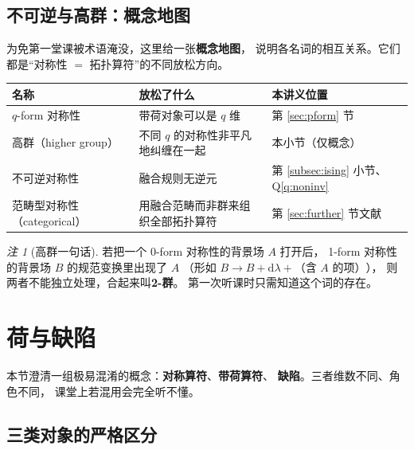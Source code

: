 \documentclass[UTF8,a4paper,11pt]{ctexart}
\theoremstyle{plain}
\theoremstyle{definition}
\theoremstyle{remark}
\newtheorem{remark}{注}[section]
\newcommand{\ext}{\mathrm{d}}          %
\newcommand{\en}[1]{\textsf{#1}}       %
\begin{document}
\subsection{不可逆与高群：概念地图}
\label{subsec:beyond}

为免第一堂课被术语淹没，这里给一张\textbf{概念地图}，
说明各名词的相互关系。它们都是“对称性 $=$ 拓扑算符”的不同放松方向。

\begin{center}
\begin{tabular}{@{}lll@{}}
\toprule
名称 & 放松了什么 & 本讲义位置 \\
\midrule
$q$-form 对称性 & 带荷对象可以是 $q$ 维
  & 第 \ref{sec:pform} 节 \\
高群（\en{higher group}） & 不同 $q$ 的对称性非平凡地纠缠在一起
  & 本小节（仅概念）\\
不可逆对称性 & 融合规则无逆元
  & 第 \ref{subsec:ising} 小节、Q\ref{q:noninv} \\
范畴型对称性（\en{categorical}） & 用融合范畴而非群来组织全部拓扑算符
  & 第 \ref{sec:further} 节文献 \\
\bottomrule
\end{tabular}
\end{center}

\begin{remark}[高群一句话]
若把一个 0-form 对称性的背景场 $A$ 打开后，
1-form 对称性的背景场 $B$ 的规范变换里出现了 $A$
（形如 $B\to B+\ext\lambda+\text{（含 }A\text{ 的项）}$），
则两者不能独立处理，合起来叫\textbf{2-群}。
第一次听课时只需知道这个词的存在。
\end{remark}

\section{荷与缺陷}
\label{sec:charges-defects}

本节澄清一组极易混淆的概念：\textbf{对称算符}、\textbf{带荷算符}、
\textbf{缺陷}。三者维数不同、角色不同，
课堂上若混用会完全听不懂。

\subsection{三类对象的严格区分}
\end{document}
